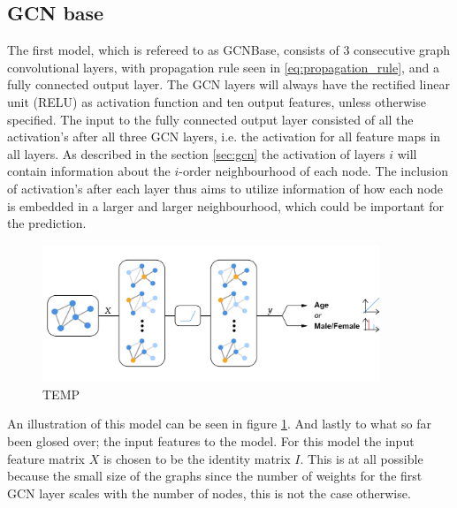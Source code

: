 \subsection{GCN base}
The first model, which is refereed to as GCNBase, consists of 3 consecutive graph convolutional layers, with propagation rule seen in \eqref{eq:propagation_rule}, and a fully connected output layer. The GCN layers will always have the rectified linear unit (RELU) as activation function and ten output features, unless otherwise specified. The input to the fully connected output layer consisted of all the activation's after all three GCN layers, i.e. the activation for all feature maps in all layers. As described in the section \ref{sec:gcn} the activation of layers $i$ will contain information about the $i$-order neighbourhood of each node. The inclusion of activation's after each layer thus aims to utilize information of how each node is embedded in a larger and larger neighbourhood, which could be important for the prediction.


%         

\begin{figure}[H]
    \includegraphics[width=0.9\textwidth]{chapters/images_methods/gcn.png}
    \caption{TEMP}
    \label{fig:gcn_base}
\end{figure}

An illustration of this model can be seen in figure \ref{fig:gcn_base}. And lastly to what so far been glosed over; the input features to the model. For this model the input feature matrix $X$ is chosen to be the identity matrix $I$. This is at all possible because the small size of the graphs since the number of weights for the first GCN layer scales with the number of nodes, this is not the case otherwise.

